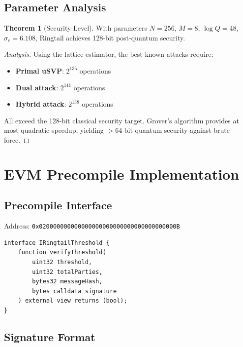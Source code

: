 \documentclass[11pt,a4paper]{article}
\theoremstyle{definition}
\newtheorem{theorem}{Theorem}
\begin{document}
\subsection{Parameter Analysis}

\begin{theorem}[Security Level]
With parameters $N=256$, $M=8$, $\log Q = 48$, $\sigma_e = 6.108$, Ringtail achieves 128-bit post-quantum security.
\end{theorem}

\begin{proof}[Analysis]
Using the lattice estimator, the best known attacks require:
\begin{itemize}
\item \textbf{Primal uSVP}: $2^{135}$ operations
\item \textbf{Dual attack}: $2^{141}$ operations
\item \textbf{Hybrid attack}: $2^{138}$ operations
\end{itemize}
All exceed the 128-bit classical security target. Grover's algorithm provides at most quadratic speedup, yielding $> 64$-bit quantum security against brute force.
\end{proof}

\section{EVM Precompile Implementation}

\subsection{Precompile Interface}

Address: \texttt{0x020000000000000000000000000000000000000B}

\begin{lstlisting}[language=Solidity]
interface IRingtailThreshold {
    function verifyThreshold(
        uint32 threshold,
        uint32 totalParties,
        bytes32 messageHash,
        bytes calldata signature
    ) external view returns (bool);
}
\end{lstlisting}

\subsection{Signature Format}
\end{document}
